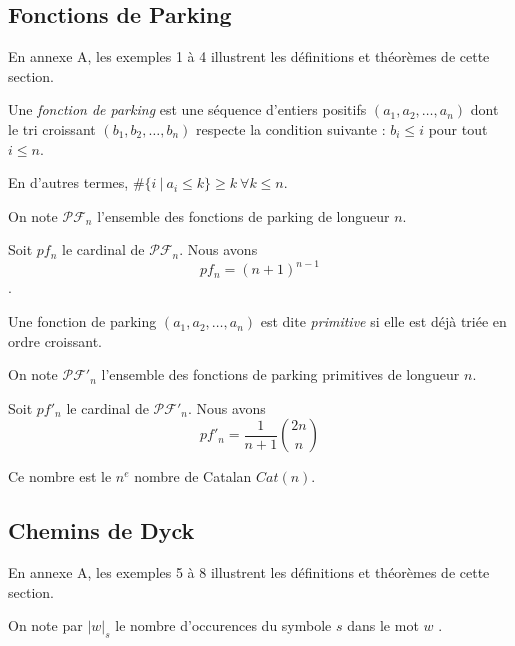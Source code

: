 
\subsection{Fonctions de Parking}

En annexe A, les exemples 1 à 4 illustrent les définitions et théorèmes
de cette section.

\begin{definition}
    Une \emph{fonction de parking} est une séquence d'entiers positifs
    $(a_1, a_2, \ldots, a_n)$ dont le tri croissant
    $(b_1, b_2, \ldots, b_n)$ respecte la condition suivante :
    $b_i \leqslant i$ pour tout $i \leqslant n$.
\end{definition}

En d'autres termes, $\#\{i\ |\ a_i \leqslant k\} \geqslant k\ 
\forall k \leqslant n$.

On note $\mathcal{PF}_n$ l'ensemble des fonctions de parking de longueur $n$.

\begin{theorem}
    Soit $pf_n$ le cardinal de $\mathcal{PF}_n$.
    Nous avons $$pf_n = (n + 1)^{n-1}$$.
\end{theorem}

\begin{definition}
    Une fonction de parking $(a_1, a_2, \ldots, a_n)$ est dite
    \emph{primitive} si elle est déjà triée en ordre croissant.    
\end{definition}

On note $\mathcal{PF'}_n$ l'ensemble des fonctions de parking primitives
de longueur $n$.

\begin{theorem}[Stanley, 1999]
    Soit $pf'_n$ le cardinal de $\mathcal{PF'}_n$.
    Nous avons $$pf'_n = \frac{1}{n + 1} \binom{2n}{n}$$
\end{theorem}

Ce nombre est le $n^{e}$ nombre de Catalan $Cat(n)$.

\subsection{Chemins de Dyck}

En annexe A, les exemples 5 à 8 illustrent les définitions et théorèmes
de cette section.

\begin{notation}
    On note par $|w|_s$ le nombre d'occurences du symbole $s$ dans
    le mot $w$ .
\end{notation}

